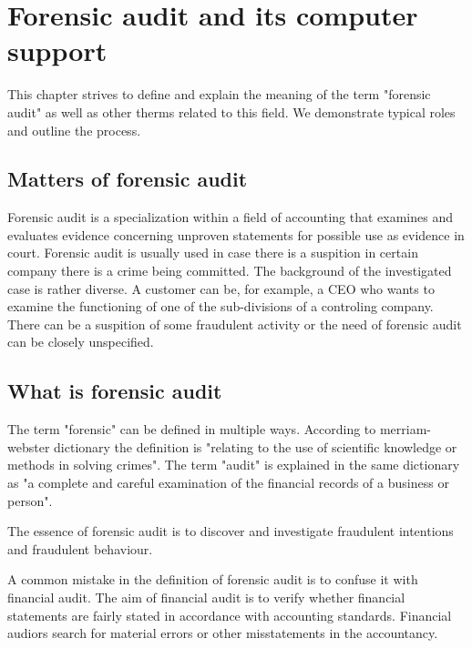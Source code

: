 \chapter{Forensic audit and its computer support}




This chapter strives to define and explain the meaning of the term "forensic audit" as well as other therms related to this field. We demonstrate typical roles and outline the process.

\section{Matters of forensic audit}
Forensic audit is a specialization within a field of accounting that examines and evaluates evidence concerning unproven statements for possible use as evidence in court. Forensic audit is usually used in case there is a suspition in certain company there is a crime being committed. The background of the investigated case is rather diverse. A customer can be, for example, a CEO  who wants to examine the functioning of one of the sub-divisions of a controling company. There can be a suspition of some fraudulent activity or the need of forensic audit can be closely unspecified.

\section{What is forensic audit}
The term "forensic" can be defined in multiple ways. According to merriam-webster dictionary  the definition is "relating to the use of scientific knowledge or methods in solving crimes". The term "audit" is explained in the same dictionary as "a complete and careful examination of the financial records of a business or person". 

The essence of forensic audit is to discover and investigate fraudulent intentions and fraudulent behaviour. 

A common mistake in the definition of forensic audit is to confuse it with financial audit. The aim of financial audit is to verify whether financial statements are fairly stated in accordance with accounting standards. Financial audiors search for material errors or other misstatements in the accountancy.

